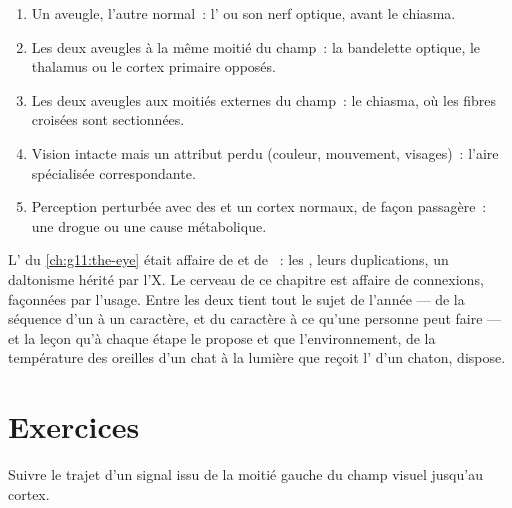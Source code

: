 \begin{method}\label{met:g11:vision-and-brain:locate}
\begin{enumerate}
  \item Un  aveugle, l'autre normal~: l' ou son nerf optique,
        avant le chiasma.
  \item Les deux  aveugles à la même moitié du champ~: la
        bandelette optique, le thalamus ou le cortex primaire opposés.
  \item Les deux  aveugles aux moitiés externes du champ~: le
        chiasma, où les fibres croisées sont sectionnées.
  \item Vision intacte mais un attribut perdu (couleur, mouvement,
        visages)~: l'aire spécialisée correspondante.
  \item Perception perturbée avec des  et un cortex normaux, de
        façon passagère~: une drogue ou une cause métabolique.
\end{enumerate}
\end{method}

\begin{remark}\label{rem:g11:vision-and-brain:year}
L' du \cref{ch:g11:the-eye} était affaire de  et de ~:
les , leurs duplications, un daltonisme hérité par l'X. Le
cerveau de ce chapitre est affaire de connexions, façonnées par
l'usage. Entre les deux tient tout le sujet de l'année --- de la
séquence d'un  à un caractère, et du caractère à ce qu'une personne
peut faire --- et la leçon qu'à chaque étape le  propose et que
l'environnement, de la température des oreilles d'un chat à la lumière
que reçoit l' d'un chaton, dispose.
\end{remark}

\section{Exercices}

\begin{exercise}[$\star$]\label{exo:g11:vision-and-brain:1}
Suivre le trajet d'un signal issu de la moitié gauche du champ visuel
jusqu'au cortex.
\end{exercise}

